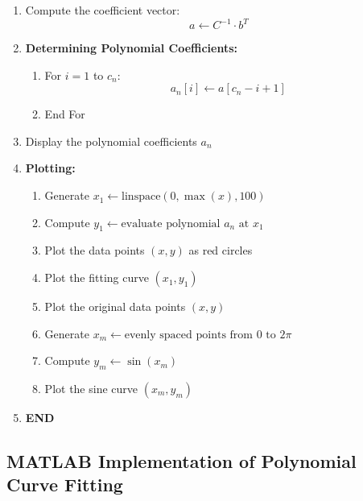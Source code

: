 \documentclass[a4paper,12pt]{article}
\begin{document}
\begin{enumerate}
	\item Compute the coefficient vector: 
	\[
	a \leftarrow C^{-1} \cdot b^T
	\]
	
	\item \textbf{Determining Polynomial Coefficients:}
	
	\begin{enumerate}
		\item For \( i = 1 \) to \( c_n \):
		\[
		a_n[i] \leftarrow a[c_n - i + 1]
		\]
		\item End For
	\end{enumerate}
	
	\item Display the polynomial coefficients \( a_n \)
	
	\item \textbf{Plotting:}
	
	\begin{enumerate}
		\item Generate \( x_1 \leftarrow \text{linspace}(0, \max(x), 100) \)
		
		\item Compute \( y_1 \leftarrow \text{evaluate polynomial } a_n \text{ at } x_1 \)
		
		\item Plot the data points \( (x, y) \) as red circles
		
		\item Plot the fitting curve \( (x_1, y_1) \)
		
		\item Plot the original data points \( (x, y) \)
		
		\item Generate \( x_m \leftarrow \text{evenly spaced points from } 0 \text{ to } 2\pi \)
		
		\item Compute \( y_m \leftarrow \sin(x_m) \)
		
		\item Plot the sine curve \( (x_m, y_m) \)
	\end{enumerate}
	
	\item \textbf{END}
\end{enumerate}

	\newpage
	\subsection{MATLAB Implementation of Polynomial Curve Fitting}
	
\end{document}
